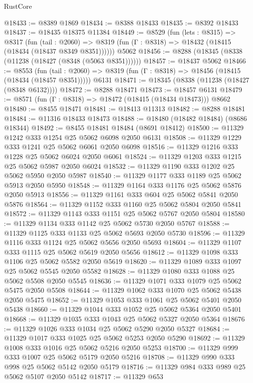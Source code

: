 \begin{lexlean}{RustCore}
\begin{coremodule}
@18433 := @8389 @1869
@18434 := @8388 @18433
@18435 := @8392 @18433
@18437 := @18435 @18375 @11384
@18449 := @8529
    (fun (lets : @8315) =>
    @8317
      (fun (tail : @2060) =>
      @8319 (fun (Γ : @8318) => @18432 (@18415 (@18434 (@18437 @8349 @8351))))))
    @5062
@18456 := @8288 (@18345 (@8338 (@11238 (@18427 (@8348 (@5063 @8351))))))
@18457 := @18437 @5062
@18466 := @8553
    (fun (tail : @2060) => @8319 (fun (Γ : @8318) => @18456 (@18415 (@18434 (@18457 @8351)))))
    @6131
@18471 := @18345 (@8338 (@11238 (@18427 (@8348 @6132))))
@18472 := @8288 @18471
@18473 := @18457 @6131
@18479 := @8571 (fun (Γ : @8318) => @18472 (@18415 (@18434 @18473))) @8662
@18480 := @8455 @18471
@18481 := @18413 @11313
@18482 := @8288 @18481
@18484 := @11316 @18433 @18473
@18488 := @18480 (@18482 @18484) (@8686 @18344)
@18492 := @8455 @18481 @18484 (@8691 @18412)
@18500 := @11329 @1242 @333 @1254 @25 @5062 @6098 @2050 @6131
@18508 := @11329 @1229 @333 @1241 @25 @5062 @6061 @2050 @6098
@18516 := @11329 @1216 @333 @1228 @25 @5062 @6024 @2050 @6061
@18524 := @11329 @1203 @333 @1215 @25 @5062 @5987 @2050 @6024
@18532 := @11329 @1190 @333 @1202 @25 @5062 @5950 @2050 @5987
@18540 := @11329 @1177 @333 @1189 @25 @5062 @5913 @2050 @5950
@18548 := @11329 @1164 @333 @1176 @25 @5062 @5876 @2050 @5913
@18556 := @11329 @1161 @333 @604 @25 @5062 @5841 @2050 @5876
@18564 := @11329 @1152 @333 @1160 @25 @5062 @5804 @2050 @5841
@18572 := @11329 @1143 @333 @1151 @25 @5062 @5767 @2050 @5804
@18580 := @11329 @1134 @333 @1142 @25 @5062 @5730 @2050 @5767
@18588 := @11329 @1125 @333 @1133 @25 @5062 @5693 @2050 @5730
@18596 := @11329 @1116 @333 @1124 @25 @5062 @5656 @2050 @5693
@18604 := @11329 @1107 @333 @1115 @25 @5062 @5619 @2050 @5656
@18612 := @11329 @1098 @333 @1106 @25 @5062 @5582 @2050 @5619
@18620 := @11329 @1089 @333 @1097 @25 @5062 @5545 @2050 @5582
@18628 := @11329 @1080 @333 @1088 @25 @5062 @5508 @2050 @5545
@18636 := @11329 @1071 @333 @1079 @25 @5062 @5475 @2050 @5508
@18644 := @11329 @1062 @333 @1070 @25 @5062 @5438 @2050 @5475
@18652 := @11329 @1053 @333 @1061 @25 @5062 @5401 @2050 @5438
@18660 := @11329 @1044 @333 @1052 @25 @5062 @5364 @2050 @5401
@18668 := @11329 @1035 @333 @1043 @25 @5062 @5327 @2050 @5364
@18676 := @11329 @1026 @333 @1034 @25 @5062 @5290 @2050 @5327
@18684 := @11329 @1017 @333 @1025 @25 @5062 @5253 @2050 @5290
@18692 := @11329 @1008 @333 @1016 @25 @5062 @5216 @2050 @5253
@18700 := @11329 @999 @333 @1007 @25 @5062 @5179 @2050 @5216
@18708 := @11329 @990 @333 @998 @25 @5062 @5142 @2050 @5179
@18716 := @11329 @984 @333 @989 @25 @5062 @5107 @2050 @5142
@18717 := @11329 @653

\end{coremodule}
\end{lexlean}
